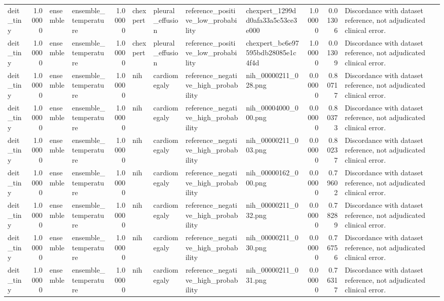\begin{tabular}{lrllrllllrrl}
deit\_tiny & 1.00000 & ensemble & ensemble\_temperature & 1.00000 & chexpert & pleural\_effusion & reference\_positive\_low\_probability & chexpert\_1299dd0afa33a5c53ce3e000 & 1.00000 & 0.01306 & Discordance with dataset reference, not adjudicated clinical error. \\
deit\_tiny & 1.00000 & ensemble & ensemble\_temperature & 1.00000 & chexpert & pleural\_effusion & reference\_positive\_low\_probability & chexpert\_bc6e97595bdb28085e1c4f4d & 1.00000 & 0.01309 & Discordance with dataset reference, not adjudicated clinical error. \\
deit\_tiny & 1.00000 & ensemble & ensemble\_temperature & 1.00000 & nih & cardiomegaly & reference\_negative\_high\_probability & nih\_00000211\_028.png & 0.00000 & 0.80717 & Discordance with dataset reference, not adjudicated clinical error. \\
deit\_tiny & 1.00000 & ensemble & ensemble\_temperature & 1.00000 & nih & cardiomegaly & reference\_negative\_high\_probability & nih\_00004000\_000.png & 0.00000 & 0.80373 & Discordance with dataset reference, not adjudicated clinical error. \\
deit\_tiny & 1.00000 & ensemble & ensemble\_temperature & 1.00000 & nih & cardiomegaly & reference\_negative\_high\_probability & nih\_00000211\_003.png & 0.00000 & 0.80237 & Discordance with dataset reference, not adjudicated clinical error. \\
deit\_tiny & 1.00000 & ensemble & ensemble\_temperature & 1.00000 & nih & cardiomegaly & reference\_negative\_high\_probability & nih\_00000162\_000.png & 0.00000 & 0.79602 & Discordance with dataset reference, not adjudicated clinical error. \\
deit\_tiny & 1.00000 & ensemble & ensemble\_temperature & 1.00000 & nih & cardiomegaly & reference\_negative\_high\_probability & nih\_00000211\_032.png & 0.00000 & 0.78289 & Discordance with dataset reference, not adjudicated clinical error. \\
deit\_tiny & 1.00000 & ensemble & ensemble\_temperature & 1.00000 & nih & cardiomegaly & reference\_negative\_high\_probability & nih\_00000211\_030.png & 0.00000 & 0.76756 & Discordance with dataset reference, not adjudicated clinical error. \\
deit\_tiny & 1.00000 & ensemble & ensemble\_temperature & 1.00000 & nih & cardiomegaly & reference\_negative\_high\_probability & nih\_00000211\_031.png & 0.00000 & 0.76317 & Discordance with dataset reference, not adjudicated clinical error. \\

\end{tabular}
